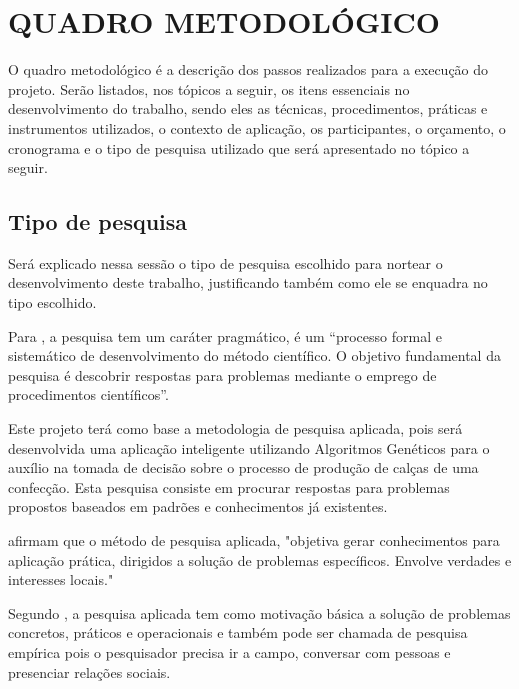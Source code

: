 
\chapter{QUADRO METODOLÓGICO}
\par O quadro metodológico é a descrição dos passos realizados para a 
execução do projeto. Serão listados, nos tópicos a seguir, os itens essenciais
no desenvolvimento do trabalho, sendo eles as técnicas, procedimentos, práticas e instrumentos
utilizados, o contexto de aplicação, os participantes, o orçamento, o cronograma
e o tipo de pesquisa utilizado que será apresentado no tópico a seguir.

\section{Tipo de pesquisa}

\par Será explicado nessa sessão o tipo de pesquisa escolhido para nortear o
desenvolvimento deste trabalho, justificando também como ele se enquadra no tipo
escolhido.

\par Para , a pesquisa tem um caráter
pragmático, é um “processo formal e sistemático de desenvolvimento do método científico. 
O objetivo fundamental da pesquisa é descobrir respostas para problemas mediante
o emprego de procedimentos científicos”.

\par Este projeto terá como base a metodologia de pesquisa aplicada, pois
será desenvolvida uma aplicação inteligente utilizando Algoritmos Genéticos para
o auxílio na tomada de decisão sobre o processo de produção de calças de uma
confecção. Esta pesquisa consiste em procurar respostas para problemas propostos
baseados em padrões e conhecimentos já existentes.

\par {} afirmam que o método de
pesquisa aplicada, "objetiva gerar conhecimentos para aplicação prática, dirigidos a
solução de problemas específicos. Envolve verdades e interesses locais."  

\par Segundo , a pesquisa
aplicada tem como motivação básica a solução de problemas
concretos, práticos e operacionais e também pode ser chamada de pesquisa
empírica pois o pesquisador precisa ir a campo, conversar com pessoas e
presenciar relações sociais.

